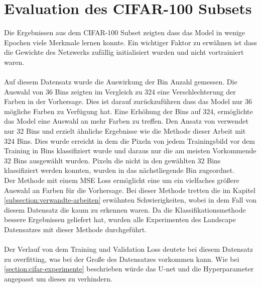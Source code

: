 \section{Evaluation des CIFAR-100 Subsets}
Die Ergebnissen aus dem CIFAR-100 Subset zeigten dass das Model in wenige Epochen viele Merkmale lernen konnte. Ein wichtiger Faktor zu 
erwähnen ist dass die Gewichte des Netzwerks zufällig initialisiert wurden und nicht vortrainiert waren. 
\\
\\
Auf diesem Datensatz wurde die Auswirkung der Bin Anzahl gemessen. Die Auswahl von 36 Bins zeigten im Vergleich zu 324 eine 
Verschlechterung der Farben in der Vorhersage. Dies ist darauf zurückzuführen dass das Model nur 36 mögliche Farben zu Verfügung hat.
Eine Erhöhung der Bins auf 324, ermöglichte das Model eine Auswahl an mehr Farben zu treffen. 
Den Ansatz von \cite{billaut2018colorunet} verwendet nur 32 Bins und erzielt ähnliche Ergebnisse wie die Methode dieser Arbeit mit 324 Bins.
Dies wurde erreicht in dem die Pixeln von jedem Trainingsbild vor dem Training in Bins klassifiziert wurde und daraus nur die am meisten
Vorkommende 32 Bins ausgewählt wurden. Pixeln die nicht in den gewählten 32 Bins klassifiziert werden konnten, wurden in das nächstliegende Bin
zugeordnet.
\\
Der Methode mit einem MSE Loss ermöglicht eine um ein vielfaches größere Auswahl an Farben für die Vorhersage. Bei dieser Methode tretten 
die im Kapitel \ref{subsection:verwandte-arbeiten} erwähnten Schwierigkeiten, wobei in dem Fall von diesem Datensatz die kaum zu erkennen waren.
Da die Klassifikationsmethode bessere Ergebnissen geliefert hat, wurden alle Experimenten des Landscape Datensatzes mit dieser Methode durchgeführt.
\\
\\
Der Verlauf von dem Training und Validation Loss deutete bei diesem Datensatz zu overfitting, was bei der Große des Datensatzes vorkommen kann.
Wie bei \ref{section:cifar-experimente} beschrieben würde das U-net und die Hyperparameter angepasst um dieses zu verhindern.

